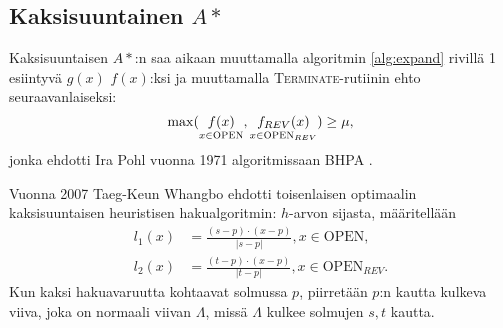 \documentclass[finnish]{tktltiki2}
\theoremstyle{definition}
\theoremstyle{remark}
\begin{document}
\subsection{Kaksisuuntainen $A\ast$}
Kaksisuuntaisen $A\ast$:n saa aikaan muuttamalla algoritmin \ref{alg:expand} rivillä 1 esiintyvä $g(x)$ $f(x)$:ksi ja muuttamalla \textsc{Terminate}-rutiinin ehto seuraavanlaiseksi:
\[
\max( \underset{x \in \textsc{OPEN}}{f(x)}, \underset{x \in \textsc{OPEN}_{REV}}{f_{REV}(x)} ) \geq \mu,
\]
jonka ehdotti Ira Pohl vuonna 1971 algoritmissaan BHPA \cite{Pohl71}.

Vuonna 2007 Taeg-Keun Whangbo ehdotti toisenlaisen optimaalin kaksisuuntaisen heuristisen hakualgoritmin: $h$-arvon sijasta, määritellään
\begin{align*}
l_1(x) &= \frac{(s - p) \cdot (x - p)}{ | s - p | }, x \in \text{OPEN}, \\
l_2(x) &= \frac{(t - p) \cdot (x - p)}{ | t - p | }, x \in \text{OPEN}_{REV}.
\end{align*}
Kun kaksi hakuavaruutta kohtaavat solmussa $p$, piirretään $p$:n kautta kulkeva viiva, joka on normaali viivan $\Lambda$, missä $\Lambda$ kulkee solmujen $s, t$ kautta.
\end{document}
